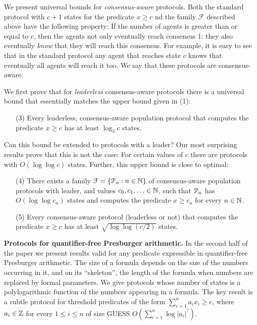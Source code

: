 We present universal bounds for \emph{consensus-aware} protocols. Both
the standard protocol with $c+1$ states for the predicate $x \geq c$
nd the family $\mathcal{F}$ described above have the following
property: If the number of agents is greater than or equal to $c$,
then the agents not only eventually reach consensus 1: they also
eventually \emph{know} that they will reach this consensus. For
example, it is easy to see that in the standard protocol any agent
that reaches state $c$ knows that eventually all agents will reach it
too. We say that these protocols are consensus-aware.

We first prove that for \emph{leaderless} consensus-aware protocols
there is a universal bound that essentially matches the upper bound
given in (1):
\begin{itemize}
\item[(3)] Every leaderless, consensus-aware population protocol that
  computes the predicate $x \geq c$ has at least $\log_3 c$ states.
\end{itemize}
Can this bound be extended to protocols with a leader? Our most
surprising results prove that this is not the case: For certain values
of $c$ there are protocols with $O(\log \log c)$ states. Further, this
upper bound is close to optimal:
\begin{itemize}
\item[(4)]There exists a family $\mathcal{F} = \{\mathcal{P}_n : n \in \mathbb{N}\}$
  of consensus-aware population protocols with leader, and values
  $c_0, c_1, \ldots \in \mathbb{N}$, such that $\mathcal{P}_n$ has $O(\log\log c_n)$
  states and computes the predicate $x \geq c_n$ for every $n \in \mathbb{N}$.
\item[(5)] Every consensus-aware protocol (leaderless or not) that
  computes the predicate $x \geq c$ has at least $\sqrt{\log \log(c /
    2)}$ states.
\end{itemize}

\medskip\noindent \textbf{Protocols for quantifier-free Presburger
  arithmetic.} In the second half of the paper we present results
valid for any predicate expressible in quantifier-free Presburger
arithmetic. The size of a formula depends on the size of the numbers
occurring in it, and on its ``skeleton'', the length of the formula
when numbers are replaced by formal parameters. We give protocols
whose number of states is a polylogarithmic function of the numbers
appearing in a formula. The key result is a subtle protocol for
threshold predicates of the form $\sum_{i=1}^n a_i x_i \geq c$, where
$a_i \in \mathbb{Z}$ for every $1 \leq i \leq n$ of size GUESS $O(
\sum_{i=1}^n \log|a_i|^{?} )$.

